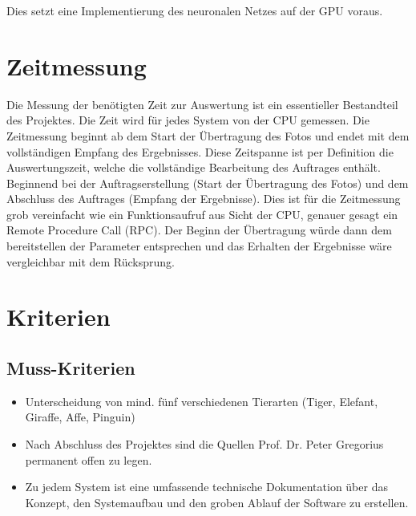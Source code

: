 Dies setzt eine Implementierung des neuronalen Netzes auf der GPU voraus.  


\section{Zeitmessung}

Die Messung der benötigten Zeit zur Auswertung ist ein essentieller Bestandteil des Projektes. Die Zeit wird für jedes System von der CPU gemessen. Die Zeitmessung beginnt ab dem Start der Übertragung des Fotos und endet mit dem vollständigen Empfang des Ergebnisses. Diese Zeitspanne ist per Definition die Auswertungszeit, welche die vollständige Bearbeitung des Auftrages enthält. Beginnend bei der Auftragserstellung (Start der Übertragung des Fotos) und dem Abschluss des Auftrages (Empfang der Ergebnisse). Dies ist für die Zeitmessung grob vereinfacht wie ein Funktionsaufruf aus Sicht der CPU,  genauer gesagt ein Remote Procedure Call (RPC). Der Beginn der Übertragung würde dann dem bereitstellen der Parameter entsprechen und das Erhalten der Ergebnisse wäre vergleichbar mit dem Rücksprung.

\newpage


\section{Kriterien}

\vspace{0.8cm}


\subsection{Muss-Kriterien}

\vspace{0.5cm}

\begin{itemize}
	\item Unterscheidung von mind. fünf verschiedenen Tierarten (Tiger, Elefant, Giraffe, Affe, Pinguin)
	\item Nach Abschluss des Projektes sind die Quellen Prof. Dr. Peter Gregorius permanent offen zu legen.
	\item Zu jedem System ist eine umfassende technische Dokumentation über das Konzept, den Systemaufbau und den groben Ablauf der Software zu erstellen.
\end{itemize}

